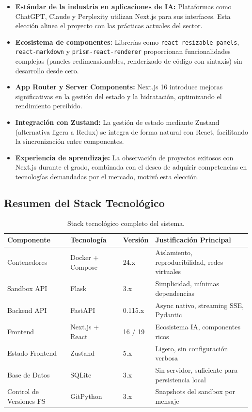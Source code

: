 \begin{itemize}
    \item \textbf{Estándar de la industria en aplicaciones de IA:} Plataformas como ChatGPT, Claude y Perplexity utilizan Next.js para sus interfaces. Esta elección alinea el proyecto con las prácticas actuales del sector.
    \item \textbf{Ecosistema de componentes:} Librerías como \texttt{react-resizable-panels}, \texttt{react-markdown} y \texttt{prism-react-renderer} proporcionan funcionalidades complejas (paneles redimensionables, renderizado de código con sintaxis) sin desarrollo desde cero.
    \item \textbf{App Router y Server Components:} Next.js 16 introduce mejoras significativas en la gestión del estado y la hidratación, optimizando el rendimiento percibido.
    \item \textbf{Integración con Zustand:} La gestión de estado mediante Zustand (alternativa ligera a Redux) se integra de forma natural con React, facilitando la sincronización entre componentes.
    \item \textbf{Experiencia de aprendizaje:} La observación de proyectos exitosos con Next.js durante el grado, combinada con el deseo de adquirir competencias en tecnologías demandadas por el mercado, motivó esta elección.
\end{itemize}

\subsection{Resumen del Stack Tecnológico}

\begin{table}[H]
\centering
\renewcommand{\arraystretch}{1.3}
\begin{tabular}{|l|l|l|p{5cm}|}
\hline
\rowcolor[gray]{0.85}
\textbf{Componente} & \textbf{Tecnología} & \textbf{Versión} & \textbf{Justificación Principal} \\
\hline
Contenedores & Docker + Compose & 24.x & Aislamiento, reproducibilidad, redes virtuales \\
\hline
Sandbox API & Flask & 3.x & Simplicidad, mínimas dependencias \\
\hline
Backend API & FastAPI & 0.115.x & Async nativo, streaming SSE, Pydantic \\
\hline
Frontend & Next.js + React & 16 / 19 & Ecosistema IA, componentes ricos \\
\hline
Estado Frontend & Zustand & 5.x & Ligero, sin configuración verbosa \\
\hline
Base de Datos & SQLite & 3.x & Sin servidor, suficiente para persistencia local \\
\hline
Control de Versiones FS & GitPython & 3.x & Snapshots del sandbox por mensaje \\
\hline
\end{tabular}
\caption{Stack tecnológico completo del sistema.}
\label{tab:stack_completo}
\end{table}

